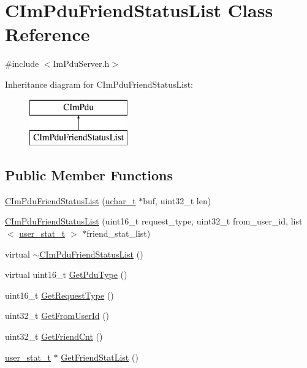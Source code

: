 \hypertarget{class_c_im_pdu_friend_status_list}{}\section{C\+Im\+Pdu\+Friend\+Status\+List Class Reference}
\label{class_c_im_pdu_friend_status_list}


{\ttfamily \#include $<$Im\+Pdu\+Server.\+h$>$}

Inheritance diagram for C\+Im\+Pdu\+Friend\+Status\+List\+:\begin{figure}[H]
\begin{center}
\leavevmode
\includegraphics[height=2.000000cm]{class_c_im_pdu_friend_status_list}
\end{center}
\end{figure}
\subsection*{Public Member Functions}
\begin{DoxyCompactItemize}
\item 
\hyperlink{class_c_im_pdu_friend_status_list_adb4673ce976a0f0a4696e5aa0ae2461c}{C\+Im\+Pdu\+Friend\+Status\+List} (\hyperlink{base_2ostype_8h_a124ea0f8f4a23a0a286b5582137f0b8d}{uchar\+\_\+t} $\ast$buf, uint32\+\_\+t len)
\item 
\hyperlink{class_c_im_pdu_friend_status_list_a1fef7d503075c9dd8f61c96d42337884}{C\+Im\+Pdu\+Friend\+Status\+List} (uint16\+\_\+t request\+\_\+type, uint32\+\_\+t from\+\_\+user\+\_\+id, list$<$ \hyperlink{structuser__stat__t}{user\+\_\+stat\+\_\+t} $>$ $\ast$friend\+\_\+stat\+\_\+list)
\item 
virtual \hyperlink{class_c_im_pdu_friend_status_list_a7edfe4a47c819e7ee80ab4eaa1ed4e20}{$\sim$\+C\+Im\+Pdu\+Friend\+Status\+List} ()
\item 
virtual uint16\+\_\+t \hyperlink{class_c_im_pdu_friend_status_list_a927bdb932e25c96648817ea0afe27762}{Get\+Pdu\+Type} ()
\item 
uint16\+\_\+t \hyperlink{class_c_im_pdu_friend_status_list_aa42763dace967d61ed74d9f9fb792475}{Get\+Request\+Type} ()
\item 
uint32\+\_\+t \hyperlink{class_c_im_pdu_friend_status_list_a6a36f64c1d9f904998e341c2f9078304}{Get\+From\+User\+Id} ()
\item 
uint32\+\_\+t \hyperlink{class_c_im_pdu_friend_status_list_ad2fb950fc714b3a601e4d3255ad5bfed}{Get\+Friend\+Cnt} ()
\item 
\hyperlink{structuser__stat__t}{user\+\_\+stat\+\_\+t} $\ast$ \hyperlink{class_c_im_pdu_friend_status_list_a0a13d5fc395e77873fd9dc304feb7f99}{Get\+Friend\+Stat\+List} ()
\end{DoxyCompactItemize}
